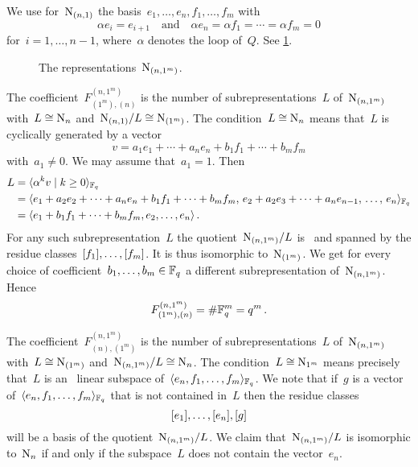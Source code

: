 \documentclass[a4paper, 11pt, twoside=semi]{scrartcl}
\begin{document}
We use for~$\mathrm{N}_{(n,1)}$ the basis~$e_1, \dotsc, e_n, f_1, \dotsc, f_m$ with
\[
  \alpha e_i = e_{i+1}
  \quad\text{and}\quad
  \alpha e_n = \alpha f_1 = \dotsb = \alpha f_m = 0
\]
for~$i = 1, \dotsc, n-1$, where~$\alpha$ denotes the loop of~$Q$.
See \cref{basis for n 1}.
\begin{figure}[tb]
  \centering
    \caption{The representations~$\mathrm{N}_{(n, 1^m)}$.}
  \label{basis for n 1}
\end{figure}

The coefficient~$F^{(n, 1^m)}_{(1^m), (n)}$ is the number of subrepresentations~$L$ of~$\mathrm{N}_{(n, 1^m)}$ with~$L \cong \mathrm{N}_n$ and~$\mathrm{N}_{(n,1)} / L \cong \mathrm{N}_{(1^m)}$.
The condition~$L \cong \mathrm{N}_n$ means that~$L$ is cyclically generated by a vector
\[
  v
  =
  a_1 e_1 + \dotsb + a_n e_n
  + b_1 f_1 + \dotsb + b_m f_m
\]
with~$a_1 \neq 0$.
We may assume that~$a_1 = 1$.
Then
\begin{align*}
  L
  &=
  \gen{ \alpha^k v \suchthat k \geq 0 }_{\Finite_q}
  \\
  &=
  \gen{
    e_1 + a_2 e_2 + \dotsb + a_n e_n
    + b_1 f_1 + \dotsb + b_m f_m,
    \,
    e_2 + a_2 e_3 + \dotsb + a_n e_{n-1},
    \,
    \dotsc,
    \,
    e_n
  }_{\Finite_q}
  \\
  &=
  \gen{ e_1 + b_1 f_1 + \dotsb + b_m f_m, e_2, \dotsc, e_n } \,.
\end{align*}
For any such subrepresentation~$L$ the quotient~$\mathrm{N}_{(n, 1^m)} / L$ is~ and spanned by the residue classes~$[f_1], \dotsc, [f_m]$.
It is thus isomorphic to~$\mathrm{N}_{(1^m)}$.
We get for every choice of coefficient~$b_1, \dotsc, b_m \in \mathbb{F}_q$ a different subrepresentation of~$\mathrm{N}_{(n, 1^m)}$.
Hence
\[
  F^{(n, 1^m)}_{(1^m), (n)}
  =
  \# \mathbb{F}_q^m
  =
  q^m \,.
\]

The coefficient~$F^{(n, 1^m)}_{(n), (1^m)}$ is the number of subrepresentations~$L$ of~$\mathrm{N}_{(n, 1^m)}$ with~$L \cong \mathrm{N}_{(1^m)}$ and~$\mathrm{N}_{(n, 1^m)}/L \cong \mathrm{N}_n$.
The condition~$L \cong \mathrm{N}_{1^m}$ means precisely that~$L$ is an~ linear subspace of~$\langle e_n, f_1, \dotsc, f_m \rangle_{\mathbb{F}_q}$.
We note that if~$g$ is a vector of~$\langle e_n, f_1, \dotsc, f_m \rangle_{\mathbb{F}_q}$ that is not contained in~$L$ then the residue classes
\[
  [e_1], \dotsc, [e_n], [g]
\]
will be a basis of the quotient~$\mathrm{N}_{(n, 1^m)} / L$.
We claim that~$\mathrm{N}_{(n, 1^m)} / L$ is isomorphic to~$\mathrm{N}_n$ if and only if the subspace~$L$ does not contain the vector~$e_n$.
\end{document}
